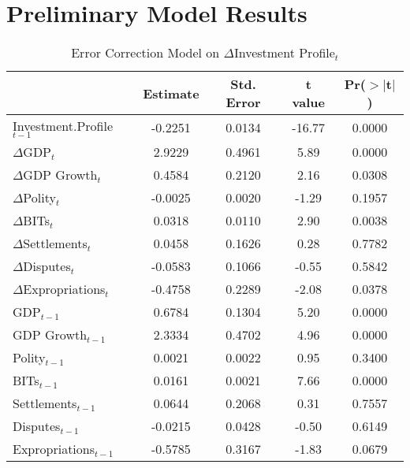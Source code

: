 \newpage

\section{Preliminary Model Results}
\begin{table}[ht]
\centering
\label{tab:invprofile}
\caption{Error Correction Model on $\Delta$Investment Profile$_{t}$}
\begin{tabular}{lcccc}
  \hline\hline
 & Estimate & Std. Error & t value & Pr($>$$|$t$|$) \\ 
  \hline
Investment.Profile$_{t-1}$ & -0.2251 & 0.0134 & -16.77 & 0.0000 \\ 
\hline
  $\Delta$GDP$_{t}$ & 2.9229 & 0.4961 & 5.89 & 0.0000 \\ 
  $\Delta$GDP Growth$_{t}$ & 0.4584 & 0.2120 & 2.16 & 0.0308 \\ 
  $\Delta$Polity$_{t}$ & -0.0025 & 0.0020 & -1.29 & 0.1957 \\ 
  $\Delta$BITs$_{t}$ & 0.0318 & 0.0110 & 2.90 & 0.0038 \\ 
  $\Delta$Settlements$_{t}$ & 0.0458 & 0.1626 & 0.28 & 0.7782 \\ 
  $\Delta$Disputes$_{t}$ & -0.0583 & 0.1066 & -0.55 & 0.5842 \\ 
  $\Delta$Expropriations$_{t}$ & -0.4758 & 0.2289 & -2.08 & 0.0378 \\ 
  \hline
  GDP$_{t-1}$ & 0.6784 & 0.1304 & 5.20 & 0.0000 \\ 
  GDP Growth$_{t-1}$ & 2.3334 & 0.4702 & 4.96 & 0.0000 \\ 
  Polity$_{t-1}$ & 0.0021 & 0.0022 & 0.95 & 0.3400 \\ 
  BITs$_{t-1}$ & 0.0161 & 0.0021 & 7.66 & 0.0000 \\ 
  Settlements$_{t-1}$ & 0.0644 & 0.2068 & 0.31 & 0.7557 \\ 
  Disputes$_{t-1}$ & -0.0215 & 0.0428 & -0.50 & 0.6149 \\ 
  Expropriations$_{t-1}$ & -0.5785 & 0.3167 & -1.83 & 0.0679 \\ 
   \hline\hline
\end{tabular}
\end{table}


